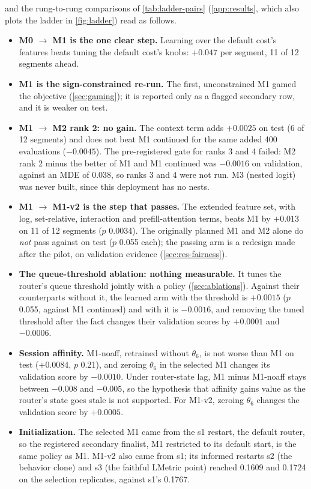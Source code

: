  and the rung-to-rung comparisons of \cref{tab:ladder-pairs}
(\cref{app:results}, which also plots the ladder in \cref{fig:ladder}) read as follows.
\begin{itemize}
  \item \textbf{M0 $\to$ M1 is the one clear step.} Learning over the default cost's features beats
    tuning the default cost's knobs: $+0.047$ per segment, 11 of 12 segments ahead.
  \item \textbf{M1 is the sign-constrained re-run.} The first, unconstrained M1 gamed the objective
    (\cref{sec:gaming}); it is reported only as a flagged secondary row, and it is weaker on test.
  \item \textbf{M1 $\to$ M2 rank 2: no gain.} The context term adds $+0.0025$ on test (6 of 12
    segments) and does not beat M1 continued for the same added 400 evaluations ($-0.0045$). The
    pre-registered gate for ranks 3 and 4 failed: M2 rank 2 minus the better of M1 and M1 continued
    was $-0.0016$ on validation, against an MDE of 0.038, so ranks 3 and 4 were not run. M3 (nested
    logit) was never built, since this deployment has no nests.
  \item \textbf{M1 $\to$ M1-v2 is the step that passes.} The extended feature set, with log,
    set-relative, interaction and prefill-attention terms, beats M1 by $+0.013$ on 11 of 12 segments
    ($p$ 0.0034). The originally planned M1 and M2 alone do \emph{not} pass against 
    on test ($p$ 0.055 each); the passing arm is a redesign made after the pilot, on validation
    evidence (\cref{sec:res-fairness}).
  \item \textbf{The queue-threshold ablation: nothing measurable.} It tunes the router's queue
    threshold jointly with a policy (\cref{sec:ablations}). Against their counterparts without it,
    the learned arm with the threshold is $+0.0015$ ($p$ 0.055, against M1
    continued) and  with it is $-0.0016$, and removing the tuned threshold after the
    fact changes their validation scores by $+0.0001$ and $-0.0006$.
  \item \textbf{Session affinity.} M1-noaff, retrained without $\theta_6$, is not worse than M1
    on test ($+0.0084$, $p$ 0.21), and zeroing $\theta_6$ in the selected M1 changes its validation
    score by $-0.0010$. Under router-state lag, M1 minus M1-noaff stays between $-0.008$ and
    $-0.005$, so the hypothesis that affinity gains value as the router's state goes stale is not
    supported. For M1-v2, zeroing $\theta_6$ changes the validation score by $+0.0005$.
  \item \textbf{Initialization.} The selected M1 came from the s1 restart, the default router,
    so the registered secondary finalist, M1 restricted to its default start, is the same policy as
    M1.
    M1-v2 also came from s1; its informed restarts s2 (the behavior clone) and s3 (the faithful LMetric point) reached 0.1609 and
    0.1724 on the selection replicates, against s1's 0.1767.
\end{itemize}
